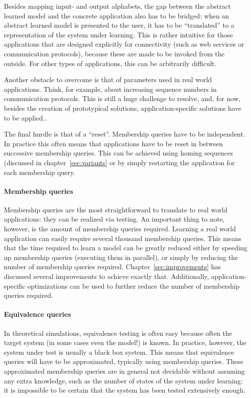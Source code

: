 \documentclass[multi,crop=false,class=article]{standalone}
\begin{document}
Besides mapping input- and output alphabets, the gap between the abstract
learned model and the concrete application also has to be bridged: when an
abstract learned model is presented to the user, it has to be ``translated'' to
a representation of the system under learning. This is rather intuitive for
those applications that are designed explicitly for connectivity (such as web
services or communication protocols), because these are made to be invoked from
the outside. For other types of applications, this can be arbitrarily difficult.

Another obstacle to overcome is that of parameters used in real world
applications. Think, for example, about increasing sequence numbers in
communication protocols. This is still a huge challenge to
resolve\cite{Steffen11a}, and, for now, besides the creation of prototypical
solutions\cite{Aarts10,Shahbaz07,Howar10}, application-specific solutions have
to be applied.\cite{Steffen11a}.

The final hurdle is that of a ``reset''. Membership queries have to be
independent. In practice this often means that applications have
to be reset in between successive membership queries. This can be achieved using
homing sequences\cite{Rivest93} (discussed in chapter~\ref{sec:variants} or by
simply restarting the application for each membership query.

\paragraph{Membership queries} Membership queries are the most straightforward
to translate to real world applications: they can be realized via testing. An
important thing to note, however, is the amount of membership queries required.
Learning a real world application can easily require several thousand membership
queries. This means that the
time required to learn a model can be greatly reduced either by speeding up
membership queries (executing them in parallel), or simply by reducing the
number of membership queries required.  Chapter~\ref{sec:improvements} has
discussed several improvements to achieve exactly that. Additionally,
application-specific optimizations can be used to further reduce the number of
membership queries required.

\paragraph{Equivalence queries} In theoretical simulations, equivalence testing
is often easy because often the target system (in some cases even the model!) is
known. In practice, however, the system under test is usually a black box
system. This means that equivalence queries will have to be approximated,
typically using membership queries. These approximated membership queries are in
general not decidable without assuming any extra knowledge\cite{Steffen11a},
such as the number of states of the system under learning: it is impossible to
be certain that the system has been tested extensively enough.
\end{document}

